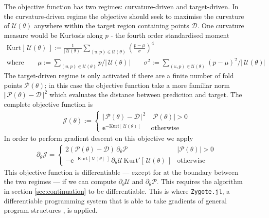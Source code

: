 \documentclass{article}[12pt]
\numberwithin{equation}{section}
\begin{document}
The objective function has two regimes: curvature-driven and target-driven. In
the curvature-driven regime the objective should seek to maximise the curvature
of $\mathcal{U}(\theta)$ anywhere within the target region containing points $\mathcal{D}$.
One curvature measure would be Kurtosis along $p$ - the fourth order standardised moment
\begin{align}
    \mathrm{Kurt}\left[\,\mathcal{U}(\theta)\,\right]:=
    \frac{1}{|\,\mathcal{U}(\theta)|}\sum_{(u,p)\in\mathcal{U}(\theta)}
    \left(\frac{p-\mu}{\sigma}\right)^4\qquad\qquad\quad\\
    \mathrm{where}\qquad
    \mu:=\!\!\!\!\!\!\sum_{(u,p)\in\mathcal{U}(\theta)}\!\!\!p/|\,\mathcal{U}(\theta)|
    \qquad
    \sigma^2:=\!\!\!\!\!\!\sum_{(u,p)\in\mathcal{U}(\theta)}\!\!\!(p-\mu)^2/|\,\mathcal{U}(\theta)|
\end{align}
The target-driven regime is only activated if there are a finite number of fold points $\mathcal{P}(\theta)$; in this case the objective function take a more familiar norm $|\,\mathcal{P}(\theta)-\mathcal{D}\,|^2$  which evaluates the distance between prediction
and target. The complete objective function is
\begin{align}
	\mathcal{J}(\theta):= \begin{cases}
	|\,\mathcal{P}(\theta)-\mathcal{D}\,|^2 & |\mathcal{P}(\theta)|>0 \\
	\mathbb{e}^{-\mathrm{Kurt}\left[\,\mathcal{U}(\theta)\,\right]} & \mathrm{otherwise}
	\end{cases}
\end{align}
In order to perform gradient descent on this objective we apply
\begin{align}
    \partial_\theta\mathcal{J}=\begin{cases}
	2(\mathcal{P}(\theta)-\mathcal{D})\,\partial_\theta\mathcal{P} & |\mathcal{P}(\theta)|>0 \\
	-\mathbb{e}^{-\mathrm{Kurt}\left[\,\mathcal{U}(\theta)\,\right]}\, \partial_\theta\mathcal{U}\,\mathrm{Kurt}'\left[\,\mathcal{U}(\theta)\,\right] & \mathrm{otherwise}
	\end{cases}
\end{align}
This objective function is differentiable --- except for at the boundary between
the two regimes --- if we can compute $\partial_\theta\mathcal{U}$ and $\partial_\theta\mathcal{P}$. This requires the algorithm in section \ref{sec:continuation} to be differentiable. This is where
\texttt{Zygote.jl}, a differentiable programming system that is able to take gradients of general program structures \cite{}, is applied.
\end{document}
